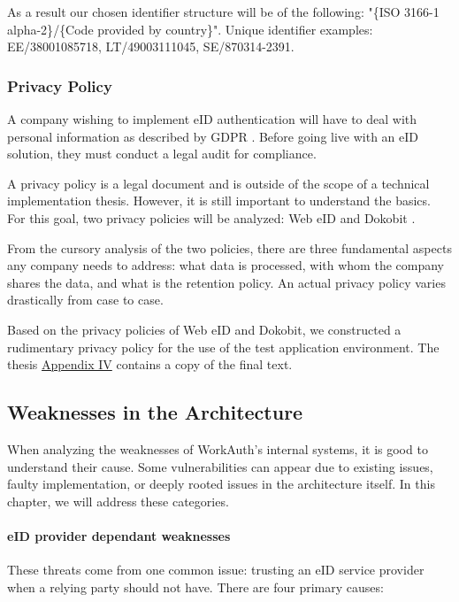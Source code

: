 As a result our chosen identifier structure will be of the following: "{\{ISO 3166-1 alpha-2\}}/{\{Code provided by country\}}". Unique identifier examples: EE/38001085718, LT/49003111045, SE/870314-2391.

\subsubsection{Privacy Policy}

A company wishing to implement eID authentication will have to deal with personal information as described by GDPR \cite{eulaw-gdpr}. Before going live with an eID solution, they must conduct a legal audit for compliance.

A privacy policy is a legal document and is outside of the scope of a technical implementation thesis. However, it is still important to understand the basics. For this goal, two privacy policies will be analyzed: Web eID \cite{legal-webeid-privacypolicy} and Dokobit \cite{legal-dokobit-privacypolicy}.

From the cursory analysis of the two policies, there are three fundamental aspects any company needs to address: what data is processed, with whom the company shares the data, and what is the retention policy. An actual privacy policy varies drastically from case to case.

Based on the privacy policies of Web eID and Dokobit, we constructed a rudimentary privacy policy for the use of the test application environment. The thesis \hyperref[appendix:privacy]{Appendix IV} contains a copy of the final text.

\subsection{Weaknesses in the Architecture}

When analyzing the weaknesses of WorkAuth's internal systems, it is good to understand their cause. Some vulnerabilities can appear due to existing issues, faulty implementation, or deeply rooted issues in the architecture itself. In this chapter, we will address these categories.

\paragraph{eID provider dependant weaknesses}

These threats come from one common issue: trusting an eID service provider when a relying party should not have. There are four primary causes:

